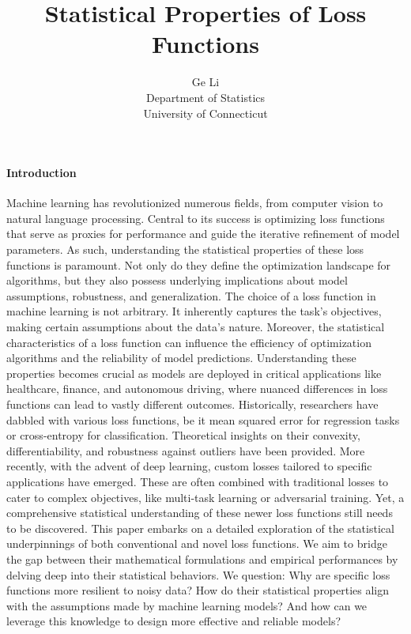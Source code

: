 \documentclass[12pt]{article}
\title{Statistical Properties of Loss Functions}
\author{Ge Li\\
  Department of Statistics\\
  University of Connecticut
}
\begin{document}
\maketitle


\paragraph{Introduction}
Machine learning has revolutionized numerous fields, from computer vision to natural language processing. Central to its success is optimizing loss functions that serve as proxies for performance and guide the iterative refinement of model parameters. As such, understanding the statistical properties of these loss functions is paramount. Not only do they define the optimization landscape for algorithms, but they also possess underlying implications about model assumptions, robustness, and generalization. The choice of a loss function in machine learning is not arbitrary. It inherently captures the task's objectives, making certain assumptions about the data's nature.
Moreover, the statistical characteristics of a loss function can influence the efficiency of optimization algorithms and the reliability of model predictions. Understanding these properties becomes crucial as models are deployed in critical applications like healthcare, finance, and autonomous driving, where nuanced differences in loss functions can lead to vastly different outcomes. Historically, researchers have dabbled with various loss functions, be it mean squared error for regression tasks or cross-entropy for classification. Theoretical insights on their convexity, differentiability, and robustness against outliers have been provided. More recently, with the advent of deep learning, custom losses tailored to specific applications have emerged. These are often combined with traditional losses to cater to complex objectives, like multi-task learning or adversarial training. Yet, a comprehensive statistical understanding of these newer loss functions still needs to be discovered. This paper embarks on a detailed exploration of the statistical underpinnings of both conventional and novel loss functions. We aim to bridge the gap between their mathematical formulations and empirical performances by delving deep into their statistical behaviors. We question: Why are specific loss functions more resilient to noisy data? How do their statistical properties align with the assumptions made by machine learning models? And how can we leverage this knowledge to design more effective and reliable models?
\end{document}
